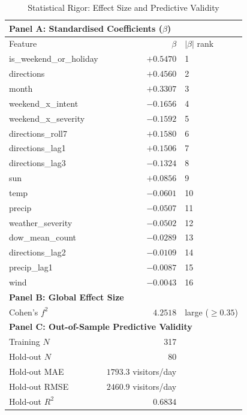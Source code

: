 \begin{table}[htbp]
\centering
\caption{Statistical Rigor: Effect Size and Predictive Validity}
\label{tab:statistical_rigor}
\begin{tabular}{lrl}
\toprule
\multicolumn{3}{l}{\textbf{Panel A: Standardised Coefficients ($\beta$)}} \\
\midrule
Feature & $\beta$ & $|\beta|$ rank \\
\midrule
  is\_weekend\_or\_holiday & $+0.5470$ & 1 \\
  directions & $+0.4560$ & 2 \\
  month & $+0.3307$ & 3 \\
  weekend\_x\_intent & $-0.1656$ & 4 \\
  weekend\_x\_severity & $-0.1592$ & 5 \\
  directions\_roll7 & $+0.1580$ & 6 \\
  directions\_lag1 & $+0.1506$ & 7 \\
  directions\_lag3 & $-0.1324$ & 8 \\
  sun & $+0.0856$ & 9 \\
  temp & $-0.0601$ & 10 \\
  precip & $-0.0507$ & 11 \\
  weather\_severity & $-0.0502$ & 12 \\
  dow\_mean\_count & $-0.0289$ & 13 \\
  directions\_lag2 & $-0.0109$ & 14 \\
  precip\_lag1 & $-0.0087$ & 15 \\
  wind & $-0.0043$ & 16 \\
\midrule
\multicolumn{3}{l}{\textbf{Panel B: Global Effect Size}} \\
\midrule
  Cohen's $f^2$ & $4.2518$ & large ($\geq 0.35$) \\
\midrule
\multicolumn{3}{l}{\textbf{Panel C: Out-of-Sample Predictive Validity}} \\
\midrule
  Training $N$ & 317 & \\
  Hold-out $N$ & 80 & \\
  Hold-out MAE & $1793.3$ visitors/day & \\
  Hold-out RMSE & $2460.9$ visitors/day & \\
  Hold-out $R^2$ & $0.6834$ & \\
\bottomrule
\end{tabular}
\end{table}